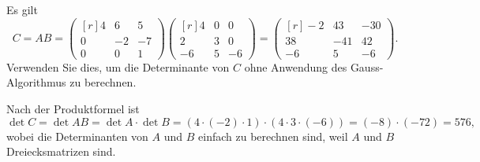 Es gilt
\[
C = AB
=
\begin{pmatrix*}[r]
   4 &  6 &  5\\
   0 & -2 & -7\\
   0 &  0 &  1
\end{pmatrix*}
\begin{pmatrix*}[r]
   4 & 0 &  0\\
   2 & 3 &  0\\
  -6 & 5 & -6
\end{pmatrix*}
=
\begin{pmatrix*}[r]
   -2 &  43 & -30\\
   38 & -41 &  42\\
   -6 &   5 &  -6
\end{pmatrix*}.
\]
Verwenden Sie dies, um die Determinante von $C$ ohne Anwendung des
Gauss-Algorithmus zu berechnen.

\begin{loesung}
Nach der Produktformel ist
\[
\det C
=
\det AB
=
\det A\cdot \det B
=
(4\cdot(-2)\cdot 1)\cdot (4\cdot 3 \cdot (-6))
=
(-8)\cdot (-72)
=
576,
\]
wobei die Determinanten von $A$ und $B$ einfach zu berechnen sind, weil
$A$ und $B$ Dreiecksmatrizen sind.
\end{loesung}

